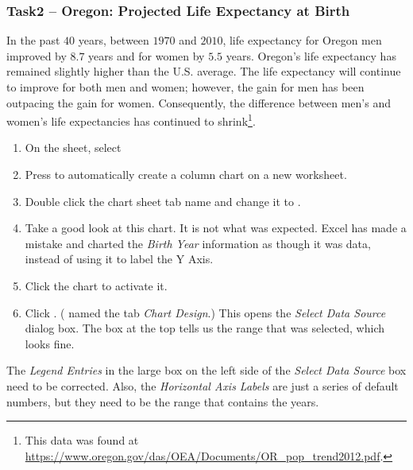 \subsubsection{Task2 – Oregon: Projected Life Expectancy at Birth}

In the past $ 40 $ years, between $ 1970 $ and $ 2010 $, life expectancy for Oregon men improved by $ 8.7 $ years and for women by $ 5.5 $ years. Oregon's life expectancy has remained slightly higher than the U.S. average. The life expectancy will continue to improve for both men and women; however, the gain for men has been outpacing the gain for women. Consequently, the difference between men's and women's life expectancies has continued to shrink\footnote{This data was found at \url{https://www.oregon.gov/das/OEA/Documents/OR_pop_trend2012.pdf}.}.

\begin{enumerate}
	\item On the  sheet, select 
	\item Press  to automatically create a column chart on a new worksheet.
	\item Double click the chart sheet tab name and change it to .
	\item Take a good look at this chart. It is not what was expected. Excel has made a mistake and charted the \textit{Birth Year} information as though it was data, instead of using it to label the Y Axis.
	\item Click the chart to activate it.
	\item Click . ( named the tab \textit{Chart Design}.) This opens the \textit{Select Data Source} dialog box. The box at the top tells us the range that was selected, which looks fine. 
\end{enumerate}
	
The \textit{Legend Entries} in the large box on the left side of the \textit{Select Data Source} box need to be corrected. Also, the \textit{Horizontal Axis Labels} are just a series of default numbers, but they need to be the range that contains the years.

